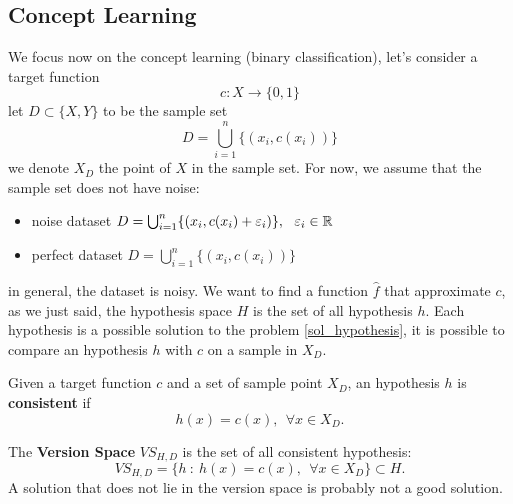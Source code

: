 \documentclass[10pt, letterpaper]{report}
\begin{document}
\subsection{Concept Learning}
We focus now on the concept learning (binary classification), let's consider a target function\begin{equation}
	c:X\rightarrow \{0,1\}
\end{equation}
let $D\subset \{X,Y\}$ to be the sample set\begin{equation}
	D=\bigcup_{i=1}^n\{(x_i,c(x_i))\}
\end{equation}
we denote $X_D$ the point of $X$ in the sample set. For now, we assume that the sample set does not have noise:\begin{itemize}
	\item noise dataset $D=\bigcup_{i=1}^n\{(x_i,c(x_i)+\varepsilon_i)\}, \ \ \varepsilon_i\in\R$
	\item perfect dataset $D=\bigcup_{i=1}^n\{(x_i,c(x_i))\}$
\end{itemize}
in general, the dataset is noisy. We want to find a function $\hat f$ that approximate $c$, as we just said, the hypothesis space $H$ is the set of all hypothesis $h$.\bigskip
Each hypothesis is a possible solution to the problem \eqref{sol_hypothesis},  it is possible to compare an hypothesis  $h$ with $c$ on a sample in $X_D$.
\begin{definition}
	Given a target function $c$ and a set of sample point $X_D$, an hypothesis $h$ is \textbf{consistent} if\begin{equation}
		h(x)=c(x), \ \ \forall x\in X_D.
	\end{equation}
\end{definition}
The \textbf{Version Space} $VS_{H,D}$ is the set of all consistent hypothesis:\begin{equation}
	VS_{H,D}=\{h \ : \ h(x)=c(x), \ \ \forall x\in X_D\}\subset H.
\end{equation}
A solution that does not lie in the version space is probably not a good solution.\bigskip
\end{document}

